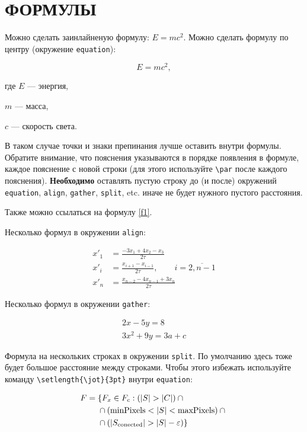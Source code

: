 \section{ФОРМУЛЫ}

Можно сделать заинлайненую формулу: $E = mc^2$. Можно сделать формулу по центру (окружение \texttt{equation}):

\begin{equation}
    \label{f1}
    E = mc^2,
\end{equation}

где $E$ --- энергия,\par $m$ --- масса,\par $c$ --- скорость света.

В таком случае точки и знаки препинания лучше оставить внутри формулы. Обратите внимание, что пояснения указываются в порядке появления в формуле, каждое пояснение с новой строки (для этого используйте \texttt{\textbackslash par} после каждого пояснения). \textbf{Необходимо} оставлять пустую строку до (и после) окружений \texttt{equation}, \texttt{align}, \texttt{gather}, \texttt{split}, etc. иначе не будет нужного пустого расстояния.  

Также можно ссылаться на формулу \ref{f1}.

Несколько формул в окружении \texttt{align}:

\begin{align}
x'_1 &= \frac{-3 x_1 + 4 x_2 - x_3}{2 \tau} \\
x'_i &= \frac{x_{i+1} - x_{i-1}}{2 \tau}, \qquad i = \overline{2, n-1} \\
x'_n &= \frac{x_{n-2} - 4 x_{n-1} + 3 x_n}{2 \tau}
\end{align}

Несколько формул в окружении \texttt{gather}:

\begin{gather} 
2x - 5y =  8 \\ 
3x^2 + 9y =  3a + c
\end{gather}

Формула на нескольких строках в окружении \texttt{split}. По умолчанию здесь тоже будет большое расстояние между строками. Чтобы этого избежать используйте команду \texttt{\textbackslash setlength\{\textbackslash jot\}\{3pt\}} внутри \texttt{equation}:

\begin{equation}
\setlength{\jot}{3pt}
\begin{split}
F = {} &\{F_{x} \in  F_{c} : (|S| > |C|) \cap {} \\
& \cap (\mathrm{minPixels}  < |S| < \mathrm{maxPixels}) \cap {} \\
& \cap (|S_{\mathrm{conected}}| > |S| - \varepsilon) \}
\end{split}
\end{equation}